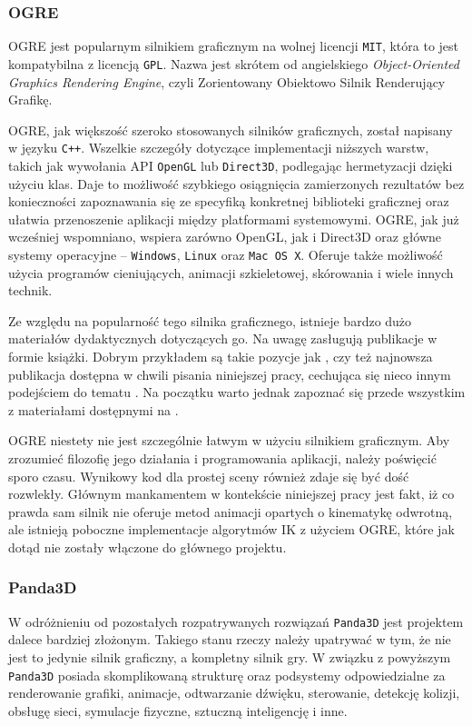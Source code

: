 \documentclass[11pt]{mwrep}
\begin{document}
 
      \subsubsection{OGRE}

      OGRE jest popularnym silnikiem graficznym na wolnej licencji \texttt{MIT}, która to jest kompatybilna z licencją \texttt{GPL}. Nazwa jest skrótem od angielskiego \textit{Object-Oriented Graphics Rendering Engine}, czyli Zorientowany Obiektowo Silnik Renderujący Grafikę.

      OGRE, jak większość szeroko stosowanych silników graficznych, został napisany w języku \texttt{C++}. Wszelkie szczegóły dotyczące implementacji niższych warstw, takich jak wywołania API \texttt{OpenGL} lub \texttt{Direct3D}, podlegając hermetyzacji dzięki użyciu klas. Daje to możliwość szybkiego osiągnięcia zamierzonych rezultatów bez konieczności zapoznawania się ze specyfiką konkretnej biblioteki graficznej oraz ułatwia przenoszenie aplikacji między platformami systemowymi. OGRE, jak już wcześniej wspomniano, wspiera zarówno OpenGL, jak i Direct3D oraz główne systemy operacyjne -- \texttt{Windows}, \texttt{Linux} oraz \texttt{Mac OS X}. Oferuje także możliwość użycia programów cieniujących, animacji szkieletowej, skórowania i wiele innych technik. 

      Ze względu na popularność tego silnika graficznego, istnieje bardzo dużo materiałów dydaktycznych dotyczących go. Na uwagę zasługują publikacje w formie książki. Dobrym przykładem są takie pozycje jak \cite{ogreb1}, czy też najnowsza publikacja dostępna w chwili pisania niniejszej pracy, cechująca się nieco innym podejściem do tematu \cite{ogreb2}. Na początku warto jednak zapoznać się przede wszystkim z materiałami dostępnymi na \cite{ogre}.

      OGRE niestety nie jest szczególnie łatwym w użyciu silnikiem graficznym. Aby zrozumieć filozofię jego działania i programowania aplikacji, należy poświęcić sporo czasu. Wynikowy kod dla prostej sceny również zdaje się być dość rozwlekły. Głównym mankamentem w kontekście niniejszej pracy jest fakt, iż co prawda sam silnik nie oferuje metod animacji opartych o kinematykę odwrotną, ale istnieją poboczne implementacje algorytmów IK z użyciem OGRE, które jak dotąd nie zostały włączone do głównego projektu.

      \subsubsection{Panda3D}
      W odróżnieniu od pozostałych rozpatrywanych rozwiązań \texttt{Panda3D} jest projektem dalece bardziej złożonym. Takiego stanu rzeczy należy upatrywać w tym, że nie jest to jedynie silnik graficzny, a kompletny silnik gry. W związku z powyższym \texttt{Panda3D} posiada skomplikowaną strukturę oraz podsystemy odpowiedzialne za renderowanie grafiki, animacje, odtwarzanie dźwięku, sterowanie, detekcję kolizji, obsługę sieci, symulacje fizyczne, sztuczną inteligencję i inne.
\end{document}
